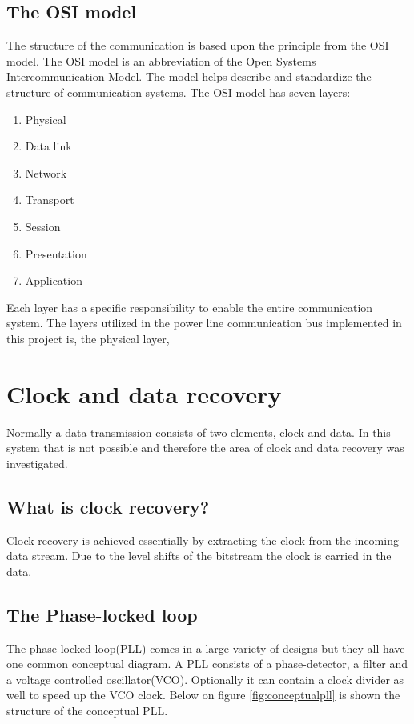 \subsection{The OSI model}
The structure of the communication is based upon the principle from the OSI model. The OSI model is an abbreviation of the Open Systems Intercommunication Model. The model helps describe and standardize the structure of communication systems. The OSI model has seven layers:
\begin{enumerate}
	\item Physical
	\item Data link
	\item Network
	\item Transport
	\item Session
	\item Presentation
	\item Application
\end{enumerate}

Each layer has a specific responsibility to enable the entire communication system. The layers utilized in the power line communication bus implemented in this project is, the physical layer, 


\section{Clock and data recovery}
Normally a data transmission consists of two elements, clock and data. In this system that is not possible and therefore the area of clock and data recovery was investigated.

\subsection{What is clock recovery?}
Clock recovery is achieved essentially by extracting the clock from the incoming data stream. Due to the level shifts of the bitstream the clock is carried in the data.

\subsection{The Phase-locked loop}
The phase-locked loop(PLL) comes in a large variety of designs but they all have one common conceptual diagram. A PLL consists of a phase-detector, a filter and a voltage controlled oscillator(VCO). Optionally it can contain a clock divider as well to speed up the VCO clock. Below on figure \ref{fig:conceptualpll} is shown the structure of the conceptual PLL.

